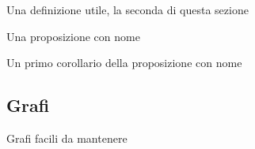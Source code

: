 \begin{definition}
    Una definizione utile, la seconda di questa sezione
\end{definition}

\begin{proposizione}
    Una proposizione con nome
\end{proposizione}

\begin{corollario}
    Un primo corollario della proposizione con nome
\end{corollario}

\subsection{Grafi}

Grafi facili da mantenere


